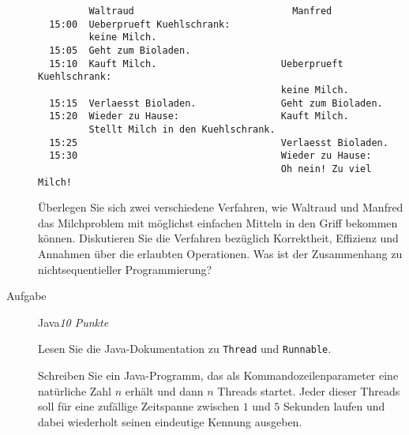 \documentclass[a4paper,twoside,12pt]{article}
\newcounter{AUFGNR}
\newcommand{\AUFGABE}[2]{\vspace{0.3cm}\item[Aufgabe~\arabic{AUFGNR}]\stepcounter{AUFGNR} #1\hfill\emph{#2}}
\begin{document}
\begin{description}
\begin{verbatim}
         Waltraud	                         Manfred
  15:00  Ueberprueft Kuehlschrank:
         keine Milch.
  15:05  Geht zum Bioladen.
  15:10  Kauft Milch.                      Ueberprueft Kuehlschrank:
                                           keine Milch.
  15:15  Verlaesst Bioladen.               Geht zum Bioladen.
  15:20  Wieder zu Hause:                  Kauft Milch.
         Stellt Milch in den Kuehlschrank.
  15:25                                    Verlaesst Bioladen.
  15:30                                    Wieder zu Hause:
                                           Oh nein! Zu viel Milch!
  \end{verbatim}

  \"Uberlegen Sie sich zwei verschiedene Verfahren, wie Waltraud
  und Manfred das Milchproblem mit m\"oglichst einfachen Mitteln
  in den Griff bekommen k\"onnen.
  Diskutieren Sie die Verfahren bez\"uglich Korrektheit, Effizienz
  und Annahmen \"uber die erlaubten Operationen.
  Was ist der Zusammenhang zu nichtsequentieller Programmierung?

  \AUFGABE{Java}{10 Punkte}

  Lesen Sie die Java-Dokumentation zu \texttt{Thread}
  und \texttt{Runnable}.

  Schreiben Sie ein Java-Programm, das als Kommandozeilenparameter eine
  nat\"urliche Zahl $n$ erh\"alt und dann $n$ Threads startet.
  Jeder dieser Threads soll f\"ur eine zuf\"allige Zeitspanne zwischen
  $1$ und $5$ Sekunden laufen und dabei wiederholt seinen eindeutige
  Kennung ausgeben.
  \end{description}
  
\end{document}
